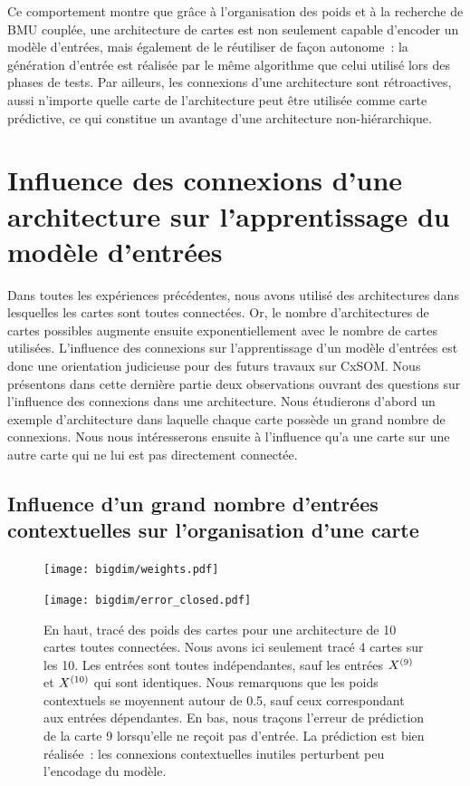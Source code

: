 \documentclass[../main]{subfiles}
\begin{document}
Ce comportement montre que grâce à l'organisation des poids et à la recherche de BMU couplée, une architecture de cartes est non seulement capable d'encoder un modèle d'entrées, mais également de le réutiliser de façon autonome~: la génération d'entrée est réalisée par le même algorithme que celui utilisé lors des phases de tests.
Par ailleurs, les connexions d'une architecture sont rétroactives, aussi n'importe quelle carte de l'architecture peut être utilisée comme carte prédictive, ce qui constitue un avantage d'une architecture non-hiérarchique.


\section{Influence des connexions d'une architecture sur l'apprentissage du modèle d'entrées}

Dans toutes les expériences précédentes, nous avons utilisé des architectures dans lesquelles les cartes sont toutes connectées. Or, le nombre d'architectures de cartes possibles augmente ensuite exponentiellement avec le nombre de cartes utilisées.
L'influence des connexions sur l'apprentissage d'un modèle d'entrées est donc une orientation judicieuse pour des futurs travaux sur CxSOM.
Nous présentons dans cette dernière partie deux observations ouvrant des questions sur l'influence des connexions dans une architecture.
Nous étudierons d'abord un exemple d'architecture dans laquelle chaque carte possède un grand nombre de connexions.
Nous nous intéresserons ensuite à l'influence qu'a une carte sur une autre carte qui ne lui est pas directement connectée.

\subsection{Influence d'un grand nombre d'entrées contextuelles sur l'organisation d'une carte}

\begin{figure}
	\begin{minipage}{\textwidth}
	\texttt{[image: bigdim/weights.pdf]}
	\end{minipage}
\begin{minipage}{\textwidth}
	\centering\texttt{[image: bigdim/error\_closed.pdf]}
	\caption{En haut, tracé des poids des cartes pour une architecture de 10 cartes toutes connectées. Nous avons ici seulement tracé 4 cartes sur les 10. Les entrées sont toutes indépendantes, sauf les entrées $X^{({9})}$ et $X^{({10})}$ qui sont identiques. Nous remarquons que les poids contextuels se moyennent autour de 0.5, sauf ceux correspondant aux entrées dépendantes. En bas, nous traçons l'erreur de prédiction de la carte 9 lorsqu'elle ne reçoit pas d'entrée. La prédiction est bien réalisée~: les connexions contextuelles inutiles perturbent peu l'encodage du modèle. \label{fig:bigdim}}
\end{minipage}
\end{figure}
\end{document}
